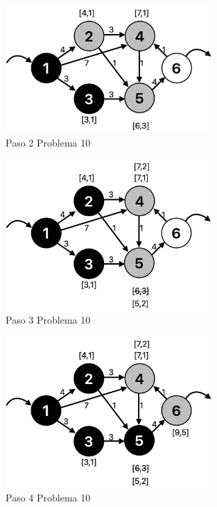 \documentclass[12pt]{article}  %
\begin{document}
\begin{figure}[H]
\centering
\caption{Paso 2 Problema 10}
\label{fig:paso2Prob10}
\includegraphics[width=0.7\textwidth]{assets/paso2Prob10.png}
\end{figure}

\begin{figure}[H]
\centering
\caption{Paso 3 Problema 10}
\label{fig:paso3Prob10}
\includegraphics[width=0.7\textwidth]{assets/paso3Prob10.png}
\end{figure}

\begin{figure}[H]
\centering
\caption{Paso 4 Problema 10}
\label{fig:paso4Prob10}
\includegraphics[width=0.7\textwidth]{assets/paso4Prob10.png}
\end{figure}
\end{document}
